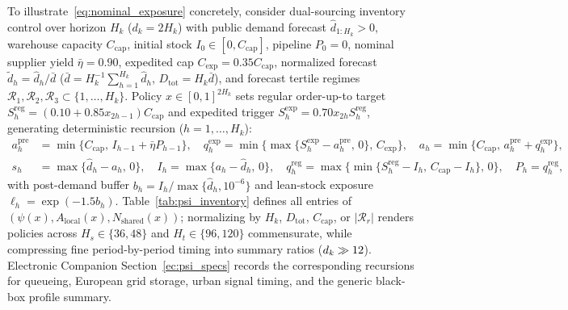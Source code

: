 To illustrate~\eqref{eq:nominal_exposure} concretely, consider dual-sourcing inventory control over horizon $H_k$ ($d_k = 2 H_k$) with public demand forecast $\hat{d}_{1:H_k} > 0$, warehouse capacity $C_{\mathrm{cap}}$, initial stock $I_0 \in [0, C_{\mathrm{cap}}]$, pipeline $P_0 = 0$, nominal supplier yield $\bar{\eta} = 0.90$, expedited cap $C_{\mathrm{exp}} = 0.35 C_{\mathrm{cap}}$, normalized forecast $\tilde{d}_h = \hat{d}_h / \bar{d}$ ($\bar{d} = H_k^{-1}\sum_{h=1}^{H_k}\hat{d}_h$, $D_{\mathrm{tot}} = H_k \bar{d}$), and forecast tertile regimes $\mathcal{R}_1, \mathcal{R}_2, \mathcal{R}_3 \subset \{1,\dots,H_k\}$. Policy $x \in [0,1]^{2 H_k}$ sets regular order-up-to target $S_h^{\mathrm{reg}} = (0.10 + 0.85 x_{2h-1}) C_{\mathrm{cap}}$ and expedited trigger $S_h^{\mathrm{exp}} = 0.70 x_{2h} S_h^{\mathrm{reg}}$, generating deterministic recursion ($h = 1,\dots,H_k$):
\begin{equation}\label{eq:inv_nominal_recursion}
  \begin{aligned}
    a_h^{\mathrm{pre}} &= \min\{C_{\mathrm{cap}},\, I_{h-1} + \bar{\eta} P_{h-1}\}, \quad
    q_h^{\mathrm{exp}} = \min\{\max\{S_h^{\mathrm{exp}} - a_h^{\mathrm{pre}},\, 0\},\, C_{\mathrm{exp}}\}, \quad
    a_h = \min\{C_{\mathrm{cap}},\, a_h^{\mathrm{pre}} + q_h^{\mathrm{exp}}\}, \\
    s_h &= \max\{\hat{d}_h - a_h,\, 0\}, \quad
    I_h = \max\{a_h - \hat{d}_h,\, 0\}, \quad
    q_h^{\mathrm{reg}} = \max\{\min\{S_h^{\mathrm{reg}} - I_h,\, C_{\mathrm{cap}} - I_h\},\, 0\}, \quad
    P_h = q_h^{\mathrm{reg}},
  \end{aligned}
\end{equation}
with post-demand buffer $b_h = I_h / \max\{\hat{d}_h, 10^{-6}\}$ and lean-stock exposure $\ell_h = \exp(-1.5 b_h)$. Table~\ref{tab:psi_inventory} defines all entries of $(\psi(x), A_{\mathrm{local}}(x), N_{\mathrm{shared}}(x))$; normalizing by $H_k$, $D_{\mathrm{tot}}$, $C_{\mathrm{cap}}$, or $|\mathcal{R}_r|$ renders policies across $H_s \in \{36, 48\}$ and $H_t \in \{96, 120\}$ commensurate, while compressing fine period-by-period timing into summary ratios ($d_k \gg 12$). Electronic Companion Section~\ref*{ec:psi_specs} records the corresponding recursions for queueing, European grid storage, urban signal timing, and the generic black-box profile summary.

